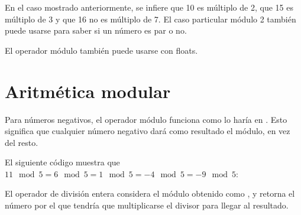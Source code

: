 
En el caso mostrado anteriormente, se infiere que 10 es múltiplo de 2, que 15 es múltiplo de 3 y que 16 no es múltiplo de 7.
El caso particular módulo 2 también puede usarse para saber si un número es par o no.

El operador módulo \ttt{\%} también puede usarse con floats.


\section{Aritmética modular}

Para números negativos, el operador módulo \ttt{\%} funciona como lo haría en .
Esto significa que cualquier número negativo dará como resultado el módulo, en vez del resto.

El siguiente código muestra que $11 \mod 5 = 6 \mod 5 = 1 \mod 5 = -4 \mod 5 = -9 \mod 5$:


El operador de división entera \ttt{//} considera el módulo obtenido como , y retorna el número por el que tendría que multiplicarse el divisor para llegar al resultado.


\clearpage